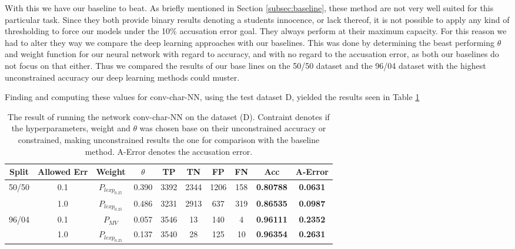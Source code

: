 With this we have our baseline to beat. As briefly mentioned in Section
\ref{subsec:baseline}, these method are not very well suited for this particular
task. Since they both provide binary results denoting a students innocence, or
lack thereof, it is not possible to apply any kind of thresholding to force
our models under the 10\% accusation error goal. They always perform at their
maximum capacity. For this reason we had to alter they way we compare the deep
learning approaches with our baselines. This was done by determining the beast
performing $\theta$ and weight function for our neural network with
regard to accuracy, and with no regard to the accusation error, as both
our baselines do not focus on that either. Thus we compared the
results of our base lines on the 50/50 dataset and the 96/04 dataset
with the highest unconstrained accuracy our deep learning methods could
muster.

Finding and computing these values for \gls{conv-char-NN},
using the test dataset D, yielded the results seen in Table \ref{tab:char_CNN_res}

\begin{table}[h]
\begin{tabular}{|c|c|c|c|c|c|c|c|c|c|}
\hline
Split & Allowed Err & Weight & $\theta$ & TP & TN & FP & FN & \textbf{Acc} & \textbf{A-Error} \\ \hline
\multirow{2}{*}{50/50} & 0.1 & $P_{lexp_{0.25}}$ & 0.390 & 3392 & 2344 & 1206 & 158 & \textbf{0.80788} & \textbf{0.0631} \\ \cline{2-10} 
 & 1.0 & $P_{lexp_{0.25}}$ & 0.486 & 3231 & 2913 & 637 & 319 & \textbf{0.86535} & \textbf{0.0987} \\ \hline
\multirow{2}{*}{96/04} & 0.1 & $P_{MV}$ & 0.057 & 3546 & 13 & 140 & 4 & \textbf{0.96111} & \textbf{0.2352} \\ \cline{2-10} 
 & 1.0 & $P_{lexp_{0.25}}$ & 0.137 & 3540 & 28 & 125 & 10 & \textbf{0.96354} & \textbf{0.2631} \\ \hline
\end{tabular}
\caption{The result of running the network \gls{conv-char-NN} on the dataset (D). Contraint
denotes if the hyperparameters, weight and $\theta$ was chosen base on their
unconstrained accuracy or constrained, making unconstrained results the one for 
comparison with the baseline method. A-Error denotes the accusation error.}
\label{tab:char_CNN_res}
\end{table}
